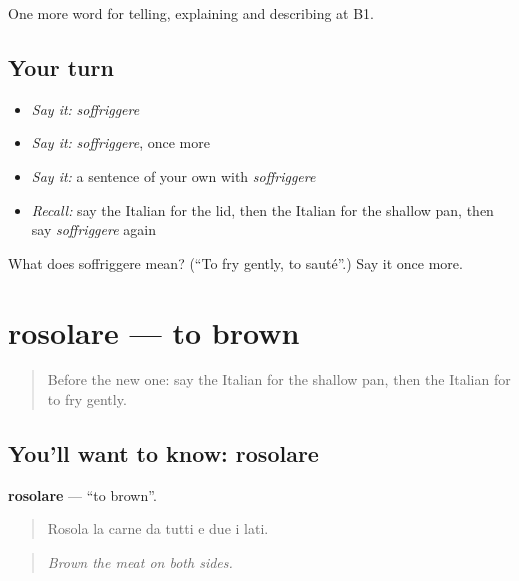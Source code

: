 \begin{grammarlens}[title={What you've built}]
One more word for telling, explaining and describing at B1.
\end{grammarlens}

\subsection*{Your turn}
\begin{itemize}
\raggedright
  \item \emph{Say it:} \emph{soffriggere}
  \item \emph{Say it:} \emph{soffriggere}, once more
  \item \emph{Say it:} a sentence of your own with \emph{soffriggere}
  \item \emph{Recall:} say the Italian for the lid, then the Italian for the shallow pan, then say \emph{soffriggere} again
\end{itemize}

\begin{tcolorbox}[breakable,colback=teal!4,colframe=teal!35!black,title={Before you move on}]
What does soffriggere mean? (\textquotedblleft{}To fry gently, to sauté\textquotedblright{}.) Say it once more.
\end{tcolorbox}
\section[rosolare]{rosolare — to brown}

\label{lesson:IT-C334-rosolare}



\begin{quote}
Before the new one: say the Italian for the shallow pan, then the Italian for to fry gently.
\end{quote}

\subsection*{You'll want to know: rosolare}
\textbf{rosolare} — \textquotedblleft{}to brown\textquotedblright{}.

\begin{quote}
Rosola la carne da tutti e due i lati.
\end{quote}

\begin{quote}
\emph{Brown the meat on both sides.}
\end{quote}

